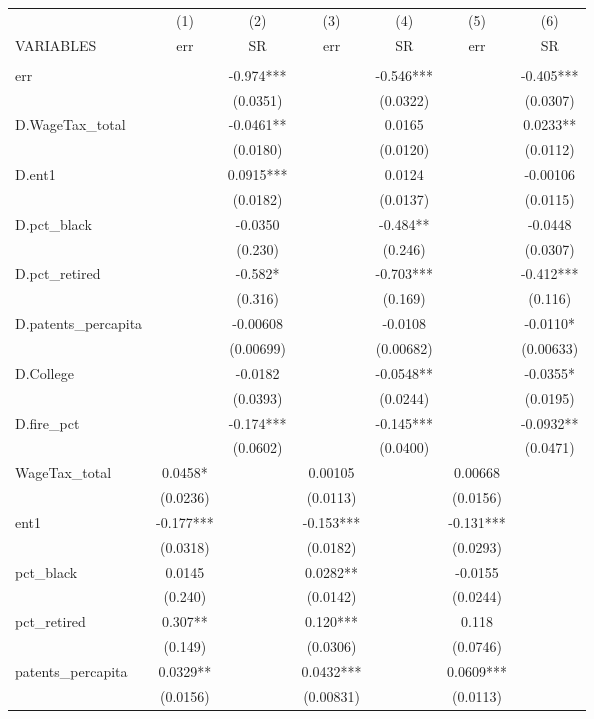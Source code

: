 \begin{tabular}{lcccccc} \hline
 & (1) & (2) & (3) & (4) & (5) & (6) \\
VARIABLES & err & SR & err & SR & err & SR \\ \hline
 &  &  &  &  &  &  \\
err &  & -0.974*** &  & -0.546*** &  & -0.405*** \\
 &  & (0.0351) &  & (0.0322) &  & (0.0307) \\
D.WageTax\_total &  & -0.0461** &  & 0.0165 &  & 0.0233** \\
 &  & (0.0180) &  & (0.0120) &  & (0.0112) \\
D.ent1 &  & 0.0915*** &  & 0.0124 &  & -0.00106 \\
 &  & (0.0182) &  & (0.0137) &  & (0.0115) \\
D.pct\_black &  & -0.0350 &  & -0.484** &  & -0.0448 \\
 &  & (0.230) &  & (0.246) &  & (0.0307) \\
D.pct\_retired &  & -0.582* &  & -0.703*** &  & -0.412*** \\
 &  & (0.316) &  & (0.169) &  & (0.116) \\
D.patents\_percapita &  & -0.00608 &  & -0.0108 &  & -0.0110* \\
 &  & (0.00699) &  & (0.00682) &  & (0.00633) \\
D.College &  & -0.0182 &  & -0.0548** &  & -0.0355* \\
 &  & (0.0393) &  & (0.0244) &  & (0.0195) \\
D.fire\_pct &  & -0.174*** &  & -0.145*** &  & -0.0932** \\
 &  & (0.0602) &  & (0.0400) &  & (0.0471) \\
WageTax\_total & 0.0458* &  & 0.00105 &  & 0.00668 &  \\
 & (0.0236) &  & (0.0113) &  & (0.0156) &  \\
ent1 & -0.177*** &  & -0.153*** &  & -0.131*** &  \\
 & (0.0318) &  & (0.0182) &  & (0.0293) &  \\
pct\_black & 0.0145 &  & 0.0282** &  & -0.0155 &  \\
 & (0.240) &  & (0.0142) &  & (0.0244) &  \\
pct\_retired & 0.307** &  & 0.120*** &  & 0.118 &  \\
 & (0.149) &  & (0.0306) &  & (0.0746) &  \\
patents\_percapita & 0.0329** &  & 0.0432*** &  & 0.0609*** &  \\
 & (0.0156) &  & (0.00831) &  & (0.0113) &  \\

\end{tabular}
